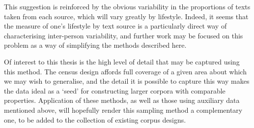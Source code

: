 This suggestion is reinforced by the obvious variability in the proportions of texts taken from each source, which will vary greatly by lifestyle.  Indeed, it seems that the measure of one's lifestyle by text source is a particularly direct way of characterising inter-person variability, and further work may be focused on this problem as a way of simplifying the methods described here.


Of interest to this thesis is the high level of detail that may be captured using this method.  The census design affords full coverage of a given area about which we may wish to generalise, and the detail it is possible to capture this way makes the data ideal as a `seed' for constructing larger corpora with comparable properties.  Application of these methods, as well as those using auxiliary data mentioned above, will hopefully render this sampling method a complementary one, to be added to the collection of existing corpus designs.
